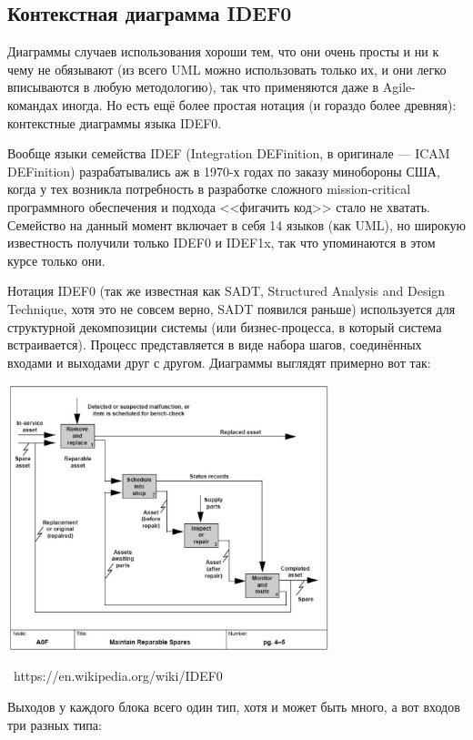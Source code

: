 \documentclass[a5paper]{article}
\newcommand{\attribution}[1] {
    \vspace{-4mm}\begin{flushright}\begin{scriptsize}%
    {\textcopyright\, #1}\end{scriptsize}\end{flushright}
}
\begin{document}
\subsection{Контекстная диаграмма IDEF0}

Диаграммы случаев использования хороши тем, что они очень просты и ни к чему не обязывают (из всего UML можно использовать только их, и они легко вписываются в любую методологию), так что применяются даже в Agile-командах иногда. Но есть ещё более простая нотация (и гораздо более древняя): контекстные диаграммы языка IDEF0.

Вообще языки семейства IDEF (Integration DEFinition, в оригинале --- ICAM DEFinition) разрабатывались аж в 1970-х годах по заказу минобороны США, когда у тех возникла потребность в разработке сложного mission-critical программного обеспечения и подхода <<фигачить код>> стало не хватать. Семейство на данный момент включает в себя 14 языков (как UML), но широкую известность получили только IDEF0 и IDEF1x, так что упоминаются в этом курсе только они.

Нотация IDEF0 (так же известная как SADT, Structured Analysis and Design Technique, хотя это не совсем верно, SADT появился раньше) используется для структурной декомпозиции системы (или бизнес-процесса, в который система встраивается). Процесс представляется в виде набора шагов, соединённых входами и выходами друг с другом. Диаграммы выглядят примерно вот так:

\begin{center}
    \includegraphics[width=0.7\textwidth]{idef0.png}
    \attribution{https://en.wikipedia.org/wiki/IDEF0}
\end{center}

Выходов у каждого блока всего один тип, хотя и может быть много, а вот входов три разных типа:
\end{document}
